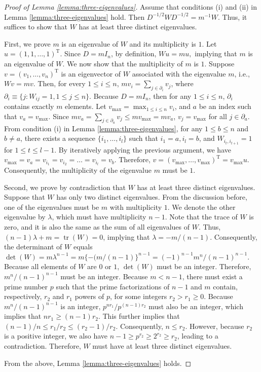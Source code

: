 \documentclass[11pt]{article}
\theoremstyle{definition}
\theoremstyle{remark}
\DeclareMathOperator{\tr}{tr}
\def\top{{ \mathrm{\scriptscriptstyle T} }}
\begin{document}
\begin{proof}[Proof of Lemma \ref{lemma:three-eigenvalues}]
Assume that conditions (i) and (ii) in Lemma \ref{lemma:three-eigenvalues} hold. Then  $D^{-1/2} W D^{-1/2} = m^{-1} W$. 
Thus, it suffices to show that $W$ has at least three distinct eigenvalues.




First, we prove $m$ is an eigenvalue of $W$ and its multiplicity is $1$. 
Let $u = (1, 1, \ldots, 1)^\top$. 
Since $D = mI_n$, by definition,  
$
Wu = m u, 
$
implying that $m$ is an eigenvalue of $W$. We now show that the multiplicity of $m$ is $1$. 
Suppose $v = (v_1,\ldots,v_n)^\top$ is an eigenvector of $W$ associated with the eigenvalue $m$, i.e., $
Wv = m v. 
$
Then, for every $1\le i\le n$, 
$m v_i = \sum_{j \in \partial_i} v_j$,  
where $\partial_i \equiv \{j: W_{ij} = 1, 1\le j \le n\}$. 
Because $D = mI_n$, then for any $1\le i\le n$, $\partial_i$ contains exactly $m$ elements. 
Let $v_{\max} = \max_{1\le i \le n} v_i$, and $a$ be an index such that $v_a = v_{\max}$. 
Since $m v_a = \sum_{j \in \partial_a} v_j \le m v_{\max} = m v_a$,  $v_j = v_{\max}$ for all $j \in \partial_a$. 
From condition (i) in Lemma \ref{lemma:three-eigenvalues}, for any $1\le b \le n$ and $b\ne a$, 
there exists a sequence $\{i_1,\ldots,i_l\}$ such that $i_1=a, i_l=b$, and $W_{i_t, i_{t+1}} =1$ for $1\le t\le l-1$. 
By iteratively applying the previous argument, we have 
$v_{\max} = v_a = v_{i_{1}} = v_{i_{2}} = \ldots = v_{i_{l}} = v_b$. 
Therefore, $v = (v_{\max}, \ldots, v_{\max})^\top = v_{\max} u$. 
Consequently, the multiplicity of the eigenvalue $m$ must be $1$.

Second, we prove by contradiction that $W$ has at least three distinct eigenvalues. 
Suppose that $W$ has only two distinct eigenvalues.
From the discussion before, 
one of the eigenvalues must be $m$ with multiplicity $1$. 
We denote the other eigenvalue by $\lambda$, which must have multiplicity $n-1$. 
Note that the trace of $W$ is zero, and it is also the same as the sum of all eigenvalues of $W$. 
Thus, 
$(n-1)\lambda + m = \tr (W) = 0$, 
implying that $\lambda = -m/(n-1)$. 
Consequently, the determinant of $W$ equals $\det(W) = m \lambda^{n-1} = m \{-(m/(n-1)\}^{n-1} = (-1)^{n-1} m^n/(n-1)^{n-1}$. 
Because all elements of $W$ are $0$ or $1$,  $\det(W)$ must be an integer. Therefore, 
$m^n/(n-1)^{n-1}$ must be an integer. 
Because $m<n-1$, there must exist a prime number $p$ such that 
the prime factorizations of $n-1$ and $m$ contain, respectively, $r_2$ and $r_1$ powers of $p$, for some integers $r_2 > r_1 \ge 0$. 
Because $m^n/(n-1)^{n-1}$ is an integer, 
$p^{nr_1}/p^{(n-1)r_2}$ must also be an integer, which implies that $nr_1 \ge (n-1)r_2$. 
This further implies that $(n-1)/n \le r_1/r_2 \le (r_2-1)/r_2$. Consequently, $n\le r_2$. 
However, 
because $r_2$ is a positive integer, we also have 
$n-1\ge p^{r_2} \ge 2^{r_2} \ge r_2$, leading to a contradiction. 
Therefore, $W$ must have at least three distinct eigenvalues. 

From the above, Lemma \ref{lemma:three-eigenvalues} holds. 
\end{proof}
\end{document}
